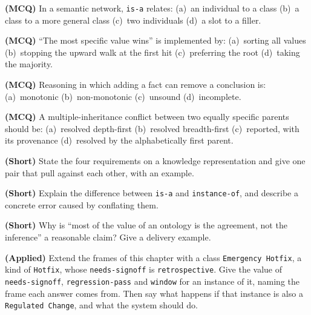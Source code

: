 \begin{reviewq}
  \item \textbf{(MCQ)} In a semantic network, \texttt{is-a} relates:
        (a)~an individual to a class (b)~a class to a more general class
        (c)~two individuals (d)~a slot to a filler.
  \item \textbf{(MCQ)} ``The most specific value wins'' is implemented by:
        (a)~sorting all values (b)~stopping the upward walk at the first hit
        (c)~preferring the root (d)~taking the majority.
  \item \textbf{(MCQ)} Reasoning in which adding a fact can remove a conclusion is:
        (a)~monotonic (b)~non-monotonic (c)~unsound (d)~incomplete.
  \item \textbf{(MCQ)} A multiple-inheritance conflict between two equally specific
        parents should be: (a)~resolved depth-first (b)~resolved breadth-first
        (c)~reported, with its provenance (d)~resolved by the alphabetically first
        parent.
  \item \textbf{(Short)} State the four requirements on a knowledge representation
        and give one pair that pull against each other, with an example.
  \item \textbf{(Short)} Explain the difference between \texttt{is-a} and
        \texttt{instance-of}, and describe a concrete error caused by conflating
        them.
  \item \textbf{(Short)} Why is ``most of the value of an ontology is the
        agreement, not the inference'' a reasonable claim? Give a delivery example.
  \item \textbf{(Applied)} Extend the frames of this chapter with a class
        \texttt{Emergency Hotfix}, a kind of \texttt{Hotfix}, whose
        \texttt{needs-signoff} is \texttt{retrospective}. Give the value of
        \texttt{needs-signoff}, \texttt{regression-pass} and \texttt{window} for an
        instance of it, naming the frame each answer comes from. Then say what
        happens if that instance is also a \texttt{Regulated Change}, and what the
        system should do.
\end{reviewq}
